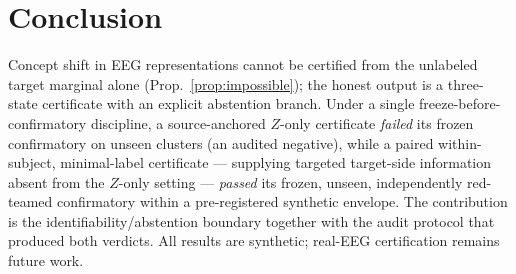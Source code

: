 \section{Conclusion}
\label{sec:conclusion}


Concept shift in EEG representations cannot be certified from the unlabeled target marginal alone
(Prop.~\ref{prop:impossible}); the honest output is a three-state certificate with an explicit abstention
branch. Under a single freeze-before-confirmatory discipline, a source-anchored $Z$-only certificate
\emph{failed} its frozen confirmatory on unseen clusters (an audited negative), while a paired
within-subject, minimal-label certificate --- supplying targeted target-side information absent from the
$Z$-only setting --- \emph{passed} its frozen, unseen, independently red-teamed confirmatory within a
pre-registered synthetic envelope. The contribution is the identifiability/abstention boundary together with
the audit protocol that produced both verdicts. All results are synthetic; real-EEG certification remains
future work.
